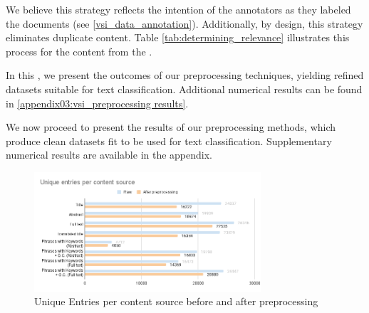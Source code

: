 We believe this strategy reflects the intention of the annotators as they labeled the documents (see \headerName{} \ref{vsi_data_annotation}). Additionally, by design, this strategy eliminates duplicate content. Table \ref{tab:determining_relevance} illustrates this process for the content from the \trafilaturaTitle{}.




\clearpage
{}
\label{vsi_results_of_preprocessing}

In this \headerName{}, we present the outcomes of our preprocessing techniques, yielding refined datasets suitable for text classification. Additional numerical results can be found in \appendixname{} \ref{appendix03:vsi_preprocessing results}.

We now proceed to present the results of our preprocessing methods, which produce clean datasets fit to be used for text classification.
Supplementary numerical results are available in the appendix.

\begin{figure}
    \centering
    \includegraphics[width=0.75\textwidth]{Figures/05/Preprocessing_Unique entries per content source.png}
    \caption{Unique Entries per content source before and after preprocessing}
    \label{fig:05_unique_entries_after_preprocessing}
\end{figure}






